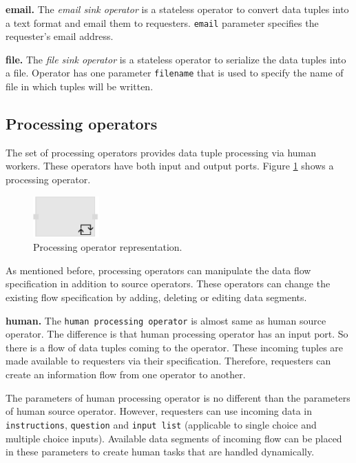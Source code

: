 \textbf{email.}
The \textit{email sink operator} is a stateless operator to convert data tuples into a 
text format and email them to requesters. \texttt{email} parameter specifies the 
requester's email address. 

\textbf{file.}
The \textit{file sink operator} is a stateless operator to serialize the data tuples into 
a file. Operator has one parameter \texttt{filename} that is used to specify the name 
of file in which tuples will be written.

\subsection{Processing operators}
The set of processing operators provides data tuple processing via human workers. 
These operators have both input and output ports. Figure \ref{fig:processing operator} shows 
a processing operator.

\begin{figure}[ht]
	\centering
	\includegraphics[height=60px]{figures/ProcessingOperator.pdf}
	\caption{Processing operator representation.}
	\label{fig:processing operator}
\end{figure}

As mentioned before, processing operators can manipulate the data flow specification 
in addition to source operators. These operators can change the existing flow specification 
by adding, deleting or editing data segments.

\textbf{human.}
The \texttt{human processing operator} is almost same as human source operator. 
The difference is that human processing operator has an input port. So there is a 
flow of data tuples coming to the operator. These incoming tuples are made available 
to requesters via their specification. Therefore, requesters can create an information 
flow from one operator to another.

The parameters of human processing operator is no different than the parameters of 
human source operator. However, requesters can use incoming data in 
\texttt{instructions}, \texttt{question} and \texttt{input list} (applicable to single choice 
and multiple choice inputs). Available data segments of incoming flow can be placed 
in these parameters to create human tasks that are handled dynamically.

